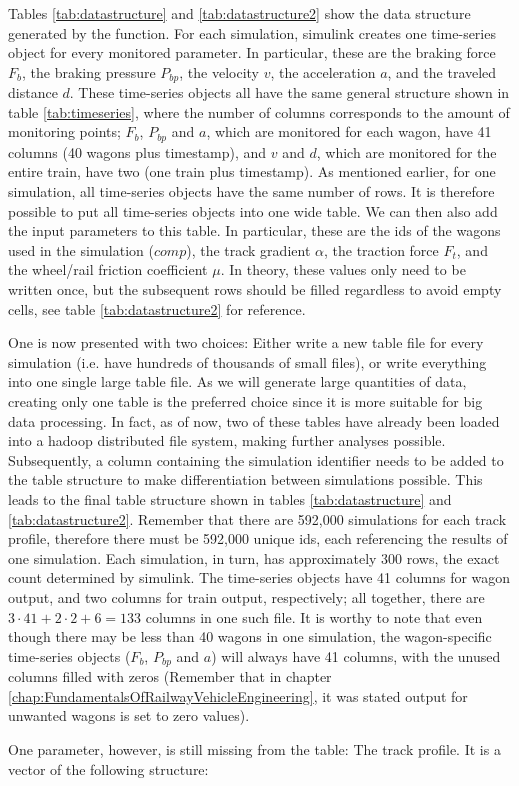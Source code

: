 \par\noindent
Tables \ref{tab:datastructure} and \ref{tab:datastructure2} show the data structure generated by the  function. For each simulation, simulink creates one time-series object for every monitored parameter. In particular, these are the braking force $F_{b}$, the braking pressure $P_{bp}$, the velocity $v$, the acceleration $a$, and the traveled distance $d$. These time-series objects all have the same general structure shown in table \ref{tab:timeseries}, where the number of columns corresponds to the amount of monitoring points; $F_{b}$, $P_{bp}$ and $a$, which are monitored for each wagon, have 41 columns (40 wagons plus timestamp), and $v$ and $d$, which are monitored for the entire train, have two (one train plus timestamp). As mentioned earlier, for one simulation, all time-series objects have the same number of rows. It is therefore possible to put all time-series objects into one wide table. We can then also add the input parameters to this table. In particular, these are the ids of the wagons used in the simulation ($comp$), the track gradient $\alpha$, the traction force $F_{t}$, and the wheel/rail friction coefficient $\mu$. In theory, these values only need to be written once, but the subsequent rows should be filled regardless to avoid empty cells, see table \ref{tab:datastructure2} for reference. 
\par
One is now presented with two choices: Either write a new table file for every simulation (i.e. have hundreds of thousands of small files), or write everything into one single large table file. As we will generate large quantities of data, creating only one table is the preferred choice since it is more suitable for big data processing. In fact, as of now, two of these tables have already been loaded into a hadoop distributed file system, making further analyses possible. Subsequently, a column containing the simulation identifier needs to be added to the table structure to make differentiation between simulations possible. This leads to the final table structure shown in tables \ref{tab:datastructure} and \ref{tab:datastructure2}. Remember that there are 592,000 simulations for each track profile, therefore there must be 592,000 unique ids, each referencing the results of one simulation. Each simulation, in turn, has approximately 300 rows, the exact count determined by simulink. The time-series objects have 41 columns for wagon output, and two columns for train output, respectively; all together, there are $3 \cdot 41 + 2 \cdot 2 + 6 = 133$ columns in one such file. It is worthy to note that even though there may be less than 40 wagons in one simulation, the wagon-specific time-series objects ($F_{b}$, $P_{bp}$ and $a$) will always have 41 columns, with the unused columns filled with zeros (Remember that in chapter \ref{chap:FundamentalsOfRailwayVehicleEngineering}, it was stated output for unwanted wagons is set to zero values).
\par
One parameter, however, is still missing from the table: The track profile. It is a vector of the following structure:


